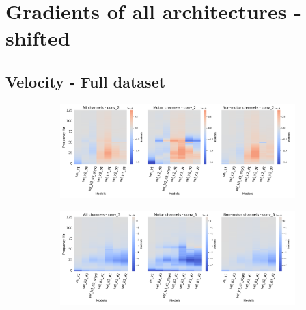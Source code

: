 \chapter{Gradients of all architectures - shifted}\label{appendixB}

\section*{Velocity - Full dataset}\label{sec:velocity-appendixB}

\begin{figure}[!htpb]
\centering
\begin{subfigure}[b]{\textwidth}
   \includegraphics[width=0.85\linewidth]{img/appendix/A/conv-2/sm/vel-model-gradients-all_kinds}
   \caption{}
   \label{fig:vel-shifted-grads-conv-2}
\end{subfigure}

\begin{subfigure}[b]{\textwidth}
   \includegraphics[width=0.85\linewidth]{img/appendix/A/conv-3/sm/vel-model-gradients-all_kinds}
   \caption{}
   \label{fig:vel-shifted-grads-conv-3}
\end{subfigure}
\end{figure}
\clearpage   

